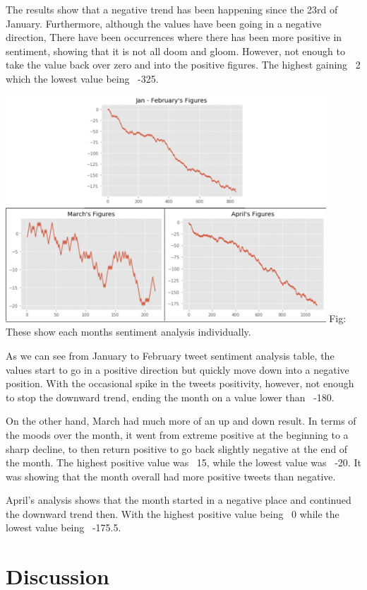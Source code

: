 \documentclass[a4paper,10pt]{article}
\begin{document}
	The results show that a negative trend has been happening since the 23rd of January. Furthermore, although the values have been going in a negative direction, There have been occurrences where there has been more positive in sentiment, showing that it is not all doom and gloom. However, not enough to take the value back over zero and into the positive figures. The highest gaining ~2 which the lowest value being ~-325.
	
	\begin{center}
		\label{confusion_matrix}
		\includegraphics[width=12cm]{eachmonth3.png}
		Fig:  These show each months sentiment analysis individually.
	\end{center}

	As we can see from January to February tweet sentiment analysis table, the values start to go in a positive direction but quickly move down into a negative position. With the occasional spike in the tweets positivity, however, not enough to stop the downward trend, ending the month on a value lower than ~-180. 
	
	On the other hand, March had much more of an up and down result. In terms of the moods over the month, it went from extreme positive at the beginning to a sharp decline, to then return positive to go back slightly negative at the end of the month. The highest positive value was ~15, while the lowest value was ~-20. It was showing that the month overall had more positive tweets than negative.
	
	April's analysis shows that the month started in a negative place and continued the downward trend then. With the highest positive value being ~0 while the lowest value being ~-175.5.
	
	\section{Discussion}
	
\end{document}
